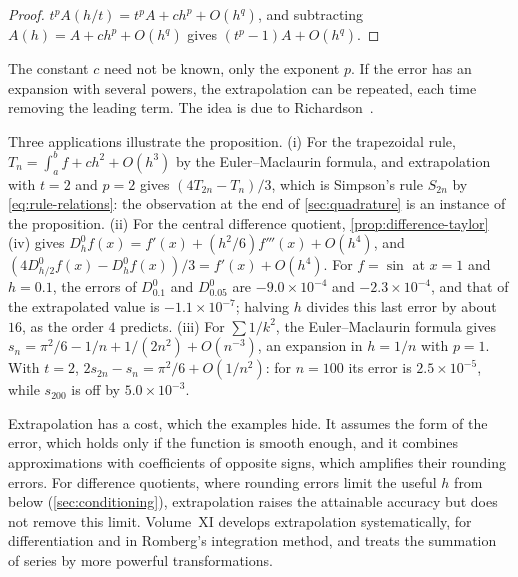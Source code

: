 \begin{proof}
$t^pA(h/t)=t^pA+ch^p+O(h^q)$, and subtracting $A(h)=A+ch^p+O(h^q)$ gives $(t^p-1)A+O(h^q)$.
\end{proof}

The constant $c$ need not be known, only the exponent $p$. If the error has an expansion with several powers, the extrapolation can be repeated, each time removing the leading term. The idea is due to Richardson~\cite{richardson1911}.

Three applications illustrate the proposition. (i) For the trapezoidal rule, $T_n=\int_a^bf+ch^2+O(h^3)$ by the Euler--Maclaurin formula, and extrapolation with $t=2$ and $p=2$ gives $(4T_{2n}-T_n)/3$, which is Simpson's rule $S_{2n}$ by \eqref{eq:rule-relations}: the observation at the end of \cref{sec:quadrature} is an instance of the proposition. (ii) For the central difference quotient, \cref{prop:difference-taylor}\,(iv) gives $D_h^0f(x)=f'(x)+(h^2/6)f'''(x)+O(h^4)$, and $(4D_{h/2}^0f(x)-D_h^0f(x))/3=f'(x)+O(h^4)$. For $f=\sin$ at $x=1$ and $h=0.1$, the errors of $D_{0.1}^0$ and $D_{0.05}^0$ are $-9.0\times10^{-4}$ and $-2.3\times10^{-4}$, and that of the extrapolated value is $-1.1\times10^{-7}$; halving $h$ divides this last error by about $16$, as the order $4$ predicts. (iii) For $\sum1/k^2$, the Euler--Maclaurin formula gives $s_n=\pi^2/6-1/n+1/(2n^2)+O(n^{-3})$, an expansion in $h=1/n$ with $p=1$. With $t=2$, $2s_{2n}-s_n=\pi^2/6+O(1/n^2)$: for $n=100$ its error is $2.5\times10^{-5}$, while $s_{200}$ is off by $5.0\times10^{-3}$.

Extrapolation has a cost, which the examples hide. It assumes the form of the error, which holds only if the function is smooth enough, and it combines approximations with coefficients of opposite signs, which amplifies their rounding errors. For difference quotients, where rounding errors limit the useful $h$ from below (\cref{sec:conditioning}), extrapolation raises the attainable accuracy but does not remove this limit. Volume~XI develops extrapolation systematically, for differentiation and in Romberg's integration method, and treats the summation of series by more powerful transformations.

